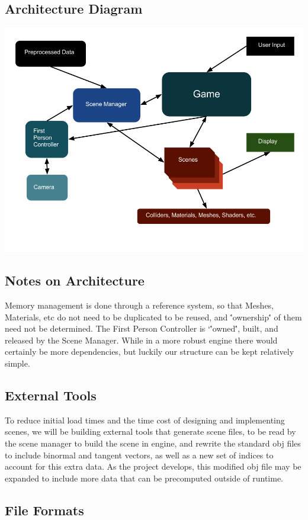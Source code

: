 \documentclass[11pt]{article} %
\begin{document}
\subsection{Architecture Diagram}
\includegraphics[scale=.4]{architecturediagram.png}
\subsection{Notes on Architecture}
Memory management is done through a reference system, so that Meshes, Materials, etc do not need to be duplicated to be reused, and \''ownership\'' of them need not be determined. The First Person Controller is `\''owned\'', built, and released by the Scene Manager. While in a more robust engine there would certainly be more dependencies, but luckily our structure can be kept relatively simple. 
\subsection{External Tools}
\par To reduce initial load times and the time cost of designing and implementing scenes, we will
 be building external tools that generate scene files, to be read by the scene manager to build the scene in engine, and rewrite the standard obj files to include binormal and tangent vectors, as well as a new set of indices to account for this extra data. As the project develops, this modified obj file may be expanded to include more data that can be precomputed outside of runtime.
\subsection{File Formats}
\end{document}
